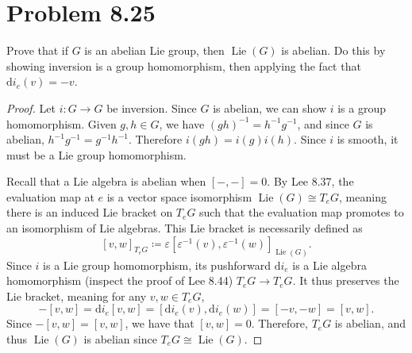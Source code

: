 \documentclass[11pt, letterpaper]{article}
\begin{document}
\section{Problem 8.25}
\begin{problem}
	Prove that if $G$ is an abelian Lie group, then $\operatorname{Lie} (G)$ is abelian. Do this by showing inversion is a group homomorphism, then applying the fact that $\mathrm{d} i_e(v)=-v$.
\end{problem}
\begin{proof}
	Let $i : G \to G$ be inversion. Since $G$ is abelian, we can show $i$ is a group homomorphism. Given $g,h\in G$, we have $(gh)^{-1} =h^{-1} g^{-1} $, and since $G$ is abelian, $h^{-1} g^{-1} =g^{-1} h^{-1} $. Therefore $i(gh)=i(g)i(h)$. Since $i$ is smooth, it must be a Lie group homomorphism.

	Recall that a Lie algebra is abelian when $[-,-]=0$. By Lee 8.37, the evaluation map at $e$ is a vector space isomorphism $\operatorname{Lie} (G)\cong T_eG$, meaning there is an induced Lie bracket on $T_eG$ such that the evaluation map promotes to an isomorphism of Lie algebras. This Lie bracket is necessarily defined as
	\[
		[v,w]_{T_eG} \coloneqq \varepsilon [\varepsilon ^{-1} (v),\varepsilon ^{-1} (w)]_{\operatorname{Lie} (G)} 
	.\]
	Since $i$ is a Lie group homomorphism, its pushforward $\mathrm{d} i_e$ is a Lie algebra homomorphism (inspect the proof of Lee 8.44) $T_eG\to T_eG$. It thus preserves the Lie bracket, meaning for any $v,w\in T_eG$,
	\[
		-[v,w]=\mathrm{d} i_e[v,w]=[\mathrm{d} i_e(v),\mathrm{d} i_e(w)]=[-v,-w]=[v,w]
	.\]
	Since $-[v,w]=[v,w]$, we have that $[v,w]=0$. Therefore, $T_eG$ is abelian, and thus $\operatorname{Lie} (G)$ is abelian since $T_eG \cong \operatorname{Lie} (G)$.
\end{proof}
\end{document}
